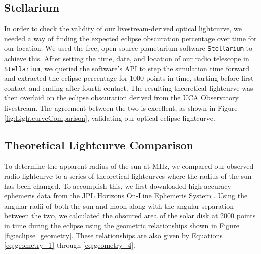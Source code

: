 \subsection{\label{sec:stellarium}Stellarium}

In order to check the validity of our livestream-derived optical lightcurve, we needed a way of finding the expected eclipse obscuration percentage over time for our location.
We used the free, open-source planetarium software \texttt{Stellarium}\cite{zotti_simulated_2020} to achieve this.
After setting the time, date, and location of our radio telescope in \texttt{Stellarium}, we queried the software's API to step the simulation time forward and extracted the eclipse percentage for 1000 points in time, starting before first contact and ending after fourth contact.
The resulting theoretical lightcurve was then overlaid on the eclipse obscuration derived from the UCA Observatory livestream.
The agreement between the two is excellent, as shown in Figure \ref{fig:LightcurveComparison}, validating our optical eclipse lightcurve.

\subsection{\label{sec:theoreticalLightcurves}Theoretical Lightcurve Comparison}

To determine the apparent radius of the sun at \unit[1420]{MHz}, we compared our observed radio lightcurve to a series of theoretical lightcurves where the radius of the sun has been changed.
To accomplish this, we first downloaded high-accuracy ephemeris data from the JPL Horizons On-Line Ephemeris System \cite{nasa_jpl_solar_system_dynamics_group_jpl_nodate}. 
Using the angular radii of both the sun and moon along with the angular separation between the two, we calculated the obscured area of the solar disk at 2000 points in time during the eclipse using the geometric relationships shown in Figure \ref{fig:eclipse_geometry}.
These relationships are also given by Equations \ref{eq:geometry_1} through \ref{eq:geometry_4}.

